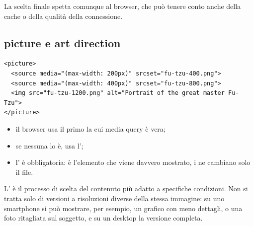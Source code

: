 La scelta finale spetta comunque al browser, che può tenere conto anche della
cache o della qualità della connessione.

\subsection{picture e art direction}

\begin{affianco}[0.6][c]
\codicepiccolo
\begin{lstlisting}[style=html, name=picture.html]
<picture>
  <source media="(max-width: 200px)" srcset="fu-tzu-400.png">
  <source media="(max-width: 400px)" srcset="fu-tzu-800.png">
  <img src="fu-tzu-1200.png" alt="Portrait of the great master Fu-Tzu">
</picture>
\end{lstlisting}
\risultato
\begin{itemize}
  \item il browser usa il primo  la cui media query è vera;
  \item se nessuna lo è, usa l';
  \item l' è obbligatoria: è l'elemento che viene davvero
        mostrato, i  ne cambiano solo il file.
\end{itemize}
\end{affianco}

L' è il processo di scelta del contenuto più adatto a
specifiche condizioni. Non si tratta solo di versioni a risoluzioni diverse
della stessa immagine: su uno smartphone si può mostrare, per esempio, un
grafico con meno dettagli, o una foto ritagliata sul soggetto, e su un desktop
la versione completa.

